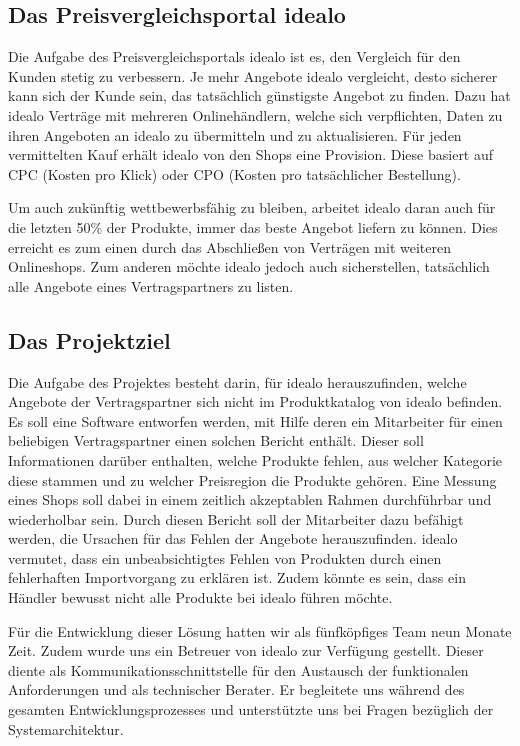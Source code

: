 \subsection{Das Preisvergleichsportal idealo}
\label{subsec:idealo}

Die Aufgabe des Preisvergleichsportals idealo ist es, den Vergleich für den Kunden stetig zu verbessern.
Je mehr Angebote idealo vergleicht, desto sicherer kann sich der Kunde sein, das tatsächlich günstigste Angebot zu
finden.
Dazu hat idealo Verträge mit mehreren Onlinehändlern, welche sich verpflichten, Daten zu ihren Angeboten an idealo zu
übermitteln und zu aktualisieren.
Für jeden vermittelten Kauf erhält idealo von den Shops eine Provision.
Diese basiert auf CPC (Kosten pro Klick) oder CPO (Kosten pro tatsächlicher Bestellung).

Um auch zukünftig wettbewerbsfähig zu bleiben, arbeitet idealo daran auch für die letzten 50\% der Produkte,
immer das beste Angebot liefern zu können.
Dies erreicht es zum einen durch das Abschließen von Verträgen mit weiteren Onlineshops.
Zum anderen möchte idealo jedoch auch sicherstellen, tatsächlich alle Angebote eines Vertragspartners zu listen.

\subsection{Das Projektziel}
\label{subsec:projektziel}

Die Aufgabe des Projektes besteht darin, für idealo herauszufinden, welche Angebote der Vertragspartner sich nicht im
Produktkatalog von idealo befinden.
Es soll eine Software entworfen werden, mit Hilfe deren ein Mitarbeiter für einen beliebigen Vertragspartner einen
solchen Bericht enthält.
Dieser soll Informationen darüber enthalten, welche Produkte fehlen, aus welcher Kategorie diese stammen und zu
welcher Preisregion die Produkte gehören.
Eine Messung eines Shops soll dabei in einem zeitlich akzeptablen Rahmen durchführbar und wiederholbar sein.
Durch diesen Bericht soll der Mitarbeiter dazu befähigt werden, die Ursachen für das Fehlen der Angebote herauszufinden.
idealo vermutet, dass ein unbeabsichtigtes Fehlen von Produkten durch einen fehlerhaften Importvorgang zu erklären ist.
Zudem könnte es sein, dass ein Händler bewusst nicht alle Produkte bei idealo führen möchte.

Für die Entwicklung dieser Lösung hatten wir als fünfköpfiges Team neun Monate Zeit.
Zudem wurde uns ein Betreuer von idealo zur Verfügung gestellt.
Dieser diente als Kommunikationsschnittstelle für den Austausch der funktionalen Anforderungen und als technischer
Berater.
Er begleitete uns während des gesamten Entwicklungsprozesses und unterstützte uns bei Fragen bezüglich der
Systemarchitektur.

